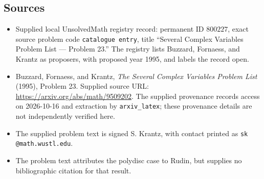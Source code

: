\documentclass[11pt]{article}
\begin{document}
\subsection{Sources}
\begin{itemize}
\item Supplied local UnsolvedMath registry record: permanent ID \(800227\), exact source problem code \texttt{catalogue entry}, title ``Several Complex Variables Problem List --- Problem 23.'' The registry lists Buzzard, Fornaess, and Krantz as proposers, with proposed year 1995, and labels the record open.
\item Buzzard, Fornaess, and Krantz, \emph{The Several Complex Variables Problem List} (1995), Problem 23. Supplied source URL: \url{https://arxiv.org/abs/math/9509202}. The supplied provenance records access on 2026-10-16 and extraction by \texttt{arxiv\_latex}; these provenance details are not independently verified here.
\item The supplied problem text is signed S. Krantz, with contact printed as \texttt{sk @math.wustl.edu}.
\item The problem text attributes the polydisc case to Rudin, but supplies no bibliographic citation for that result.
\end{itemize}
\end{document}
